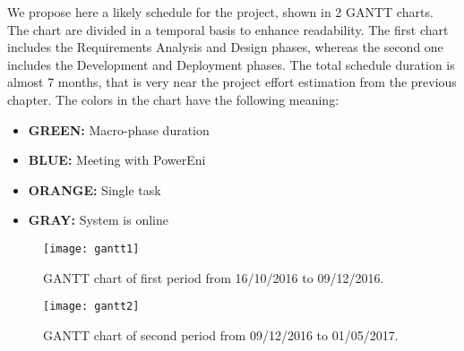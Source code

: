 We propose here a likely schedule for the project, shown in 2 GANTT charts. The chart are divided in a temporal basis to enhance readability. The first chart includes the Requirements Analysis and Design phases, whereas the second one includes the Development and Deployment phases. The total schedule duration is almost 7 months, that is very near the project effort estimation from the previous chapter. 
\bigbreak
The colors in the chart have the following meaning: 
\begin{itemize}
\item \textbf{GREEN: } Macro-phase duration
\item \textbf{BLUE: } Meeting with PowerEni
\item \textbf{ORANGE: } Single task
\item \textbf{GRAY: } System is online
\end{itemize}

\begin{figure}
  \centering
  \texttt{[image: gantt1]}
  \caption{GANTT chart of first period from 16/10/2016 to 09/12/2016.}
\end{figure}

\begin{figure}
  \centering
  \texttt{[image: gantt2]}
  \caption{GANTT chart of second period from 09/12/2016 to 01/05/2017.}
\end{figure}